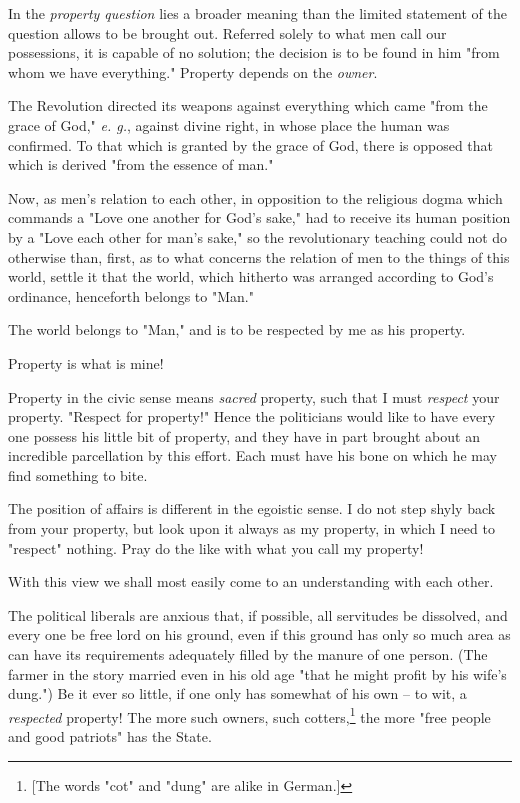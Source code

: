 In the \textit{property question} lies a broader meaning than the limited 
statement of the question allows to be brought out. Referred solely to what 
men call our possessions, it is capable of no solution; the decision is to be 
found in him "{}from whom we have everything."{} Property depends on the 
\textit{owner}.

The Revolution directed its weapons against everything which came "{}from the 
grace of God,"{} \textit{e. g.}, against divine right, in whose place the 
human was confirmed. To that which is granted by the grace of God, there is 
opposed that which is derived "{}from the essence of man."{}

Now, as men's relation to each other, in opposition to the religious dogma 
which commands a "{}Love one another for God's sake,"{} had to receive its 
human position by a "{}Love each other for man's sake,"{} so the revolutionary 
teaching could not do otherwise than, first, as to what concerns the relation 
of men to the things of this world, settle it that the world, which hitherto 
was arranged according to God's ordinance, henceforth belongs to "{}Man."{}

The world belongs to "{}Man,"{} and is to be respected by me as his property.

Property is what is mine!

Property in the civic sense means \textit{sacred} property, such that I must 
\textit{respect} your property. "{}Respect for property!"{} Hence the 
politicians would like to have every one possess his little bit of property, 
and they have in part brought about an incredible parcellation by this effort. 
Each must have his bone on which he may find something to bite.

The position of affairs is different in the egoistic sense. I do not step 
shyly back from your property, but look upon it always as my property, in 
which I need to "{}respect"{} nothing. Pray do the like with what you call my 
property!

With this view we shall most easily come to an understanding with each other.

The political liberals are anxious that, if possible, all servitudes be 
dissolved, and every one be free lord on his ground, even if this ground has 
only so much area as can have its requirements adequately filled by the manure 
of one person. (The farmer in the story married even in his old age "{}that he 
might profit by his wife's dung."{}) Be it ever so little, if one only has 
somewhat of his own -- to wit, a \textit{respected} property! The more such 
owners, such cotters,\footnote{[The words "{}cot"{} and "{}dung"{} are alike 
in German.]} the more "{}free people and good patriots"{} has the State.

